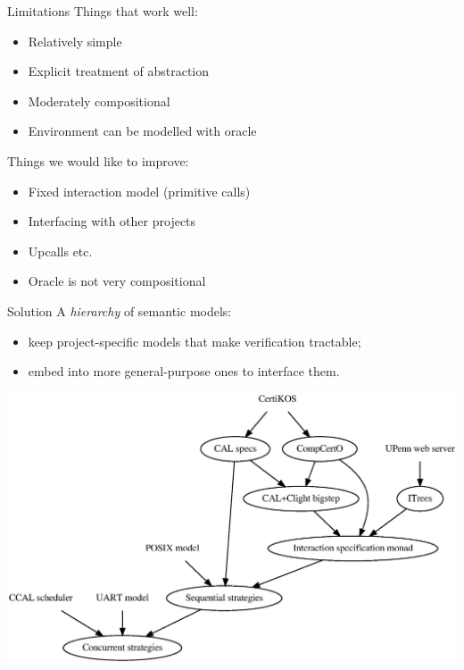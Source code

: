 \documentclass{beamer}
\begin{document}
\begin{frame}{Limitations}
  Things that work well:
  \begin{itemize}
    \item Relatively simple
    \item Explicit treatment of abstraction
    \item Moderately compositional
    \item Environment can be modelled with oracle
  \end{itemize}

  \vfill
  Things we would like to improve:
  \begin{itemize}
    \item Fixed interaction model (primitive calls)
    \item Interfacing with other projects
    \item Upcalls etc.
    \item Oracle is not very compositional
  \end{itemize}
\end{frame}

\begin{frame}{Solution}
  A \emph{hierarchy} of semantic models:
  \begin{itemize}
    \item keep project-specific models
      that make verification tractable;
    \item embed into more general-purpose ones
      to interface them.
  \end{itemize}

  \begin{center}
  \includegraphics[scale=0.4]{hierarchy}
  \end{center}
\end{frame}
\end{document}

